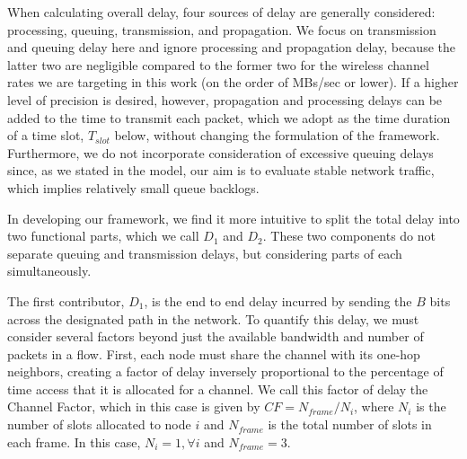 {\color{blue}When calculating overall delay, four sources of delay are generally considered: processing, queuing, transmission, and propagation. We focus on transmission and queuing delay here and ignore processing and propagation delay, because the latter two are negligible compared to the former two for the wireless channel rates we are targeting in this work (on the order of MBs/sec or lower). If a higher level of precision is desired, however, propagation and processing delays can be added to the time to transmit each packet, which we adopt as the time duration of a time slot, $T_{slot}$ below, without changing the formulation of the framework. Furthermore, we do not incorporate consideration of excessive queuing delays since, as we stated in the model, our aim is to evaluate stable network traffic, which implies relatively small queue backlogs. %


In developing our framework, we find it more intuitive to split the total delay into two functional parts, which we call $D_1$ and $D_2$. These two components do not separate queuing and transmission delays, but considering parts of each simultaneously. }
The first contributor, $D_1$, is the end to end delay incurred by sending the $B$ bits across the designated path in the network. To quantify this delay, we must consider several factors beyond just the available bandwidth and number of packets in a flow. First, each node must share the channel with its one-hop neighbors, creating a factor of delay inversely proportional to the percentage of time access that it is allocated for a channel. We call this factor of delay the Channel Factor, which in this case is given by $CF = N_{frame}/N_{i}$, where $N_{i}$ is the number of slots allocated to node $i$ and $N_{frame}$ is the total number of slots in each frame. In this case, $N_{i} = 1, \forall i$ and $N_{frame} = 3$. 

